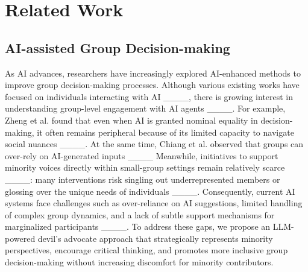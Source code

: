 \section{Related Work}
\subsection{AI-assisted Group Decision-making}
As AI advances, researchers have increasingly explored AI-enhanced methods to improve group decision-making processes. Although various existing works have focused on individuals interacting with AI ____, there is growing interest in understanding group-level engagement with AI agents ____. For example, Zheng et al. found that even when AI is granted nominal equality in decision-making, it often remains peripheral because of its limited capacity to navigate social nuances ____. At the same time, Chiang et al. observed that groups can over-rely on AI-generated inputs ____ Meanwhile, initiatives to support minority voices directly within small-group settings remain relatively scarce ____: many interventions risk singling out underrepresented members or glossing over the unique needs of individuals ____. Consequently, current AI systems face challenges such as over-reliance on AI suggestions, limited handling of complex group dynamics, and a lack of subtle support mechanisms for marginalized participants  ____. To address these gaps, we propose an LLM-powered devil’s advocate approach that strategically represents minority perspectives, encourage critical thinking, and promotes more inclusive group decision-making without increasing discomfort for minority contributors.



